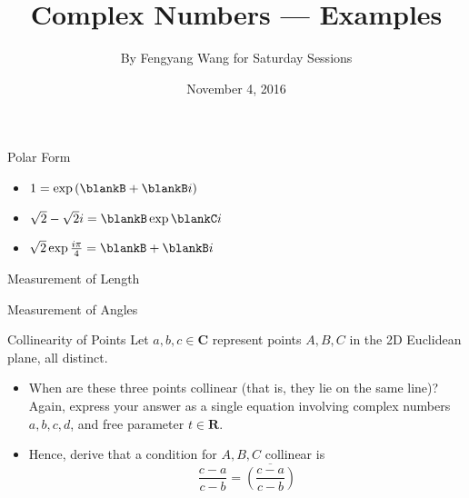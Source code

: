 \documentclass[12pt,letterpaper]{article}
\title{Complex Numbers --- Examples}
\author{By Fengyang Wang for Saturday Sessions}
\date{November 4, 2016}
\newcommand{\im}{i}
\begin{document}
\HomeworkTitle

\begin{problem}{Polar Form}
  \begin{itemize}
    \item \(1 = \exp\left(\blankB + \blankB\im\right)\)
    \item \(\sqrt{2}-\sqrt{2}\im = \blankB\exp\blankC\im\)
    \item \(\sqrt{2}\exp\frac{\im\pi}{4} = \blankB + \blankB\im\)
  \end{itemize}
\end{problem}

\begin{problem}{Measurement of Length}

\end{problem}

\begin{problem}{Measurement of Angles}

\end{problem}

\begin{problem}{Collinearity of Points}
  Let \(a, b, c\in\mathbf{C}\) represent points \(A, B, C\) in the 2D Euclidean
  plane, all distinct.

  \begin{itemize}
    \item When are these three points collinear (that is, they lie on the same
    line)? Again, express your answer as a single equation involving complex
    numbers \(a, b, c, d\), and free parameter \(t\in\mathbf{R}\).
    \item Hence, derive that a condition for \(A, B, C\) collinear is \[
      \frac{c-a}{c-b} = \overline{\left(\frac{c-a}{c-b}\right)}
    \]
  \end{itemize}
\end{problem}
\end{document}

